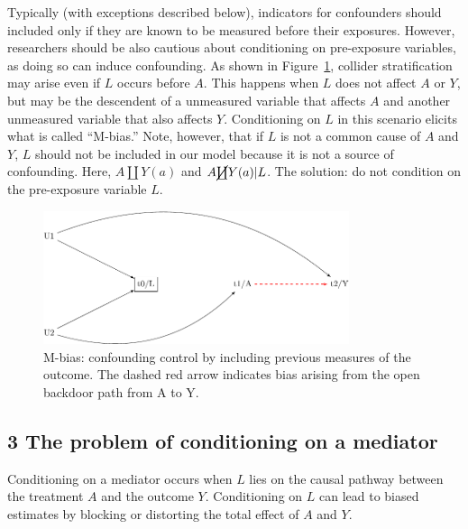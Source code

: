 \documentclass[
  singlecolumn]{report}
\begin{document}
Typically (with exceptions described below), indicators for confounders
should included only if they are known to be measured before their
exposures. However, researchers should be also cautious about
conditioning on pre-exposure variables, as doing so can induce
confounding. As shown in Figure~\ref{fig-m-bias}, collider
stratification may arise even if \(L\) occurs before \(A\). This happens
when \(L\) does not affect \(A\) or \(Y\), but may be the descendent of
a unmeasured variable that affects \(A\) and another unmeasured variable
that also affects \(Y\). Conditioning on \(L\) in this scenario elicits
what is called ``M-bias.'' Note, however, that if \(L\) is not a common
cause of \(A\) and \(Y\), \(L\) should not be included in our model
because it is not a source of confounding. Here, \(A \coprod Y(a)\) and
\(A \cancel{\coprod} Y(a)| L\). The solution: do not condition on the
pre-exposure variable \(L\).

\begin{figure}

{\centering \includegraphics[width=0.8\textwidth,height=\textheight]{causal-dags_files/figure-pdf/fig-m-bias-1.pdf}

}

\caption{\label{fig-m-bias}M-bias: confounding control by including
previous measures of the outcome. The dashed red arrow indicates bias
arising from the open backdoor path from A to Y.}

\end{figure}

\hypertarget{the-problem-of-conditioning-on-a-mediator}{%
\subsection{3 The problem of conditioning on a
mediator}\label{the-problem-of-conditioning-on-a-mediator}}

Conditioning on a mediator occurs when \(L\) lies on the causal pathway
between the treatment \(A\) and the outcome \(Y\). Conditioning on \(L\)
can lead to biased estimates by blocking or distorting the total effect
of \(A\) and \(Y\).
\end{document}

